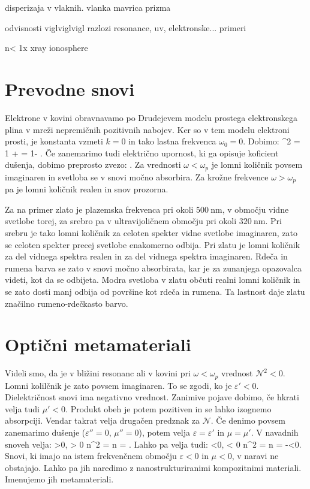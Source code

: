 disperizaja v vlaknih.
vlanka
mavrica
prizma

odvisnosti
viglviglvigl razlozi resonance, uv, elektronske... 
primeri

n< 1x xray ionosphere


\section{Prevodne snovi}
Elektrone v kovini obravnavamo po Drudejevem modelu prostega elektronskega plina
v mreži nepremičnih pozitivnih nabojev. Ker so v tem modelu elektroni prosti,
je konstanta vzmeti $k=0$ in tako lastna frekvenca $\omega_0=0$. Dobimo:
\beq
{}^2 = 1 +  = 1- 
.
\label{eq:09_36}
\eeq
Če zanemarimo tudi električno upornost, ki ga opisuje koficient dušenja, dobimo
preprosto zvezo:
\beq
{} \approx {}.
\label{eq:09_37}
\eeq
Za vrednosti $\omega < \omega_p$ je lomni količnik povsem imaginaren in svetloba se v snovi
močno absorbira. Za krožne frekvence $\omega > \omega_p$ pa je lomni količnik realen 
in snov prozorna. 

Za na primer zlato je plazemska frekvenca pri okoli $500~\si{\nano\meter}$, v območju
vidne svetlobe torej, za srebro pa v ultravijoličnem območju pri okoli $320~\si{\nano\meter}$. 
Pri srebru je tako lomni količnik za celoten spekter vidne svetlobe imaginaren, zato se celoten 
spekter precej svetlobe enakomerno odbija. Pri zlatu je lomni količnik za del vidnega spektra realen in za
del vidnega spektra imaginaren. Rdeča in rumena barva se zato v snovi močno absorbirata, kar
je za zunanjega opazovalca videti, kot da se odbijeta. Modra svetloba v zlatu občuti
realni lomni količnik in se zato dosti manj odbija od površine kot rdeča in rumena. Ta
lastnost daje zlatu značilno rumeno-rdečkasto barvo. 


\section{Optični metamateriali}
Videli smo, da je v bližini resonanc ali v kovini pri $\omega <\omega_p$ vrednost $\mathcal{N}^2 <0$.
Lomni kolilčnik je zato povsem imaginaren. To se zgodi, ko je $\varepsilon'<0$. Dielektričnost
snovi ima negativno vrednost. Zanimive pojave dobimo, če hkrati velja tudi $\mu'<0$. Produkt
obeh je potem pozitiven in se lahko izognemo absorpciji. Vendar takrat velja drugačen
predznak za $\mathcal{N}$. Če denimo povsem zanemarimo dušenje ($\varepsilon''=0$, $\mu''=0$), 
potem velja $\varepsilon=\varepsilon'$ in $\mu  = \mu'$.
V navadnih snoveh velja:
\beq
\varepsilon >0, \mu > 0 \qquad \Rightarrow \qquad n^2 = \varepsilon \mu 
\qquad \Rightarrow \qquad n = \sqrt{\varepsilon\mu}. 
\label{eq:09_37}
\eeq
Lahko pa velja tudi:
\beq
\varepsilon <0, \mu < 0 \qquad \Rightarrow \qquad n^2 = \varepsilon \mu 
\qquad \Rightarrow \qquad n = -\sqrt{\varepsilon\mu}<0. 
\label{eq:09_38}
\eeq
Snovi, ki imajo na istem frekvenčnem območju $\varepsilon<0$ in $\mu<0$, v naravi ne 
obstajajo. Lahko pa jih naredimo z nanostrukturiranimi kompozitnimi materiali. Imenujemo
jih metamateriali. 

